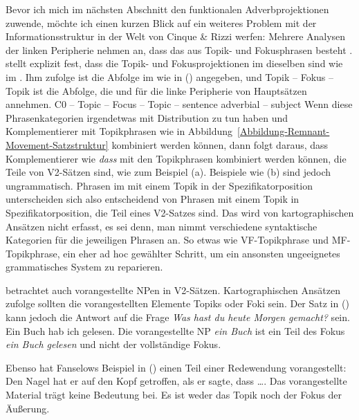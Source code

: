 Bevor ich mich im nächsten Abschnitt den funktionalen Adverbprojektionen zuwende, möchte ich einen kurzen Blick auf
ein weiteres Problem mit der Informationsstruktur in der Welt von Cinque \& Rizzi \citep[]{Rizzi97a-u} werfen: Mehrere Analysen der linken
Peripherie nehmen an, dass das \vf{} aus Topik- und Fokusphrasen besteht \parencites[,
240]{Grewendorf2002a}[, 93]{Grewendorf2005a-u}{Grewendorf2009a}. \citet[]{Grewendorf2005a-u} stellt explizit fest, dass die Topik- und Fokusprojektionen im \mf{} dieselben sind
wie im \vf. Ihm zufolge ist die Abfolge im \mf{} wie in () angegeben, und Topik -- Fokus --
Topik ist die Abfolge, die \citet[]{Rizzi97a-u} und \citet[]{Grewendorf2002a} für die linke Peripherie von
Hauptsätzen annehmen.
\ea
C0 – Topic – Focus – Topic – sentence adverbial – subject
\z
Wenn diese Phrasenkategorien irgendetwas mit Distribution zu tun haben und Komplementierer mit
Topikphrasen wie in Abbildung~\ref{Abbildung-Remnant-Movement-Satzstruktur} kombiniert werden können, dann folgt daraus, dass
Komplementierer wie \emph{dass} mit den Topikphrasen kombiniert werden können, die Teile von V2-Sätzen sind, wie zum
Beispiel (a). Beispiele wie (b) sind jedoch ungrammatisch.
\eal
{}
\zl
Phrasen im \mf{} mit einem Topik in der Spezifikatorposition unterscheiden sich also entscheidend von Phrasen mit einem
Topik in Spezifikatorposition, die Teil eines V2-Satzes sind. Das wird von kartographischen Ansätzen nicht erfasst, es sei denn, man nimmt
verschiedene syntaktische Kategorien für die jeweiligen Phrasen an. So etwas wie VF-Topikphrase und MF-%
Topikphrase, ein eher ad hoc gewählter Schritt, um ein ansonsten ungeeignetes grammatisches System zu reparieren.

\citet{Fanselow2006a} betrachtet auch vorangestellte NPen in V2-Sätzen. Kartographischen Ansätzen
zufolge sollten die vorangestellten Elemente Topiks oder Foki sein. Der Satz in () kann jedoch
die Antwort auf die Frage \emph{Was hast du heute Morgen gemacht?} sein.
\ea
Ein Buch hab ich gelesen.
\z
Die vorangestellte NP \emph{ein Buch} ist ein Teil des Fokus \emph{ein Buch gelesen}
und nicht der vollständige Fokus.

Ebenso hat Fanselows Beispiel in () einen Teil einer Redewendung
vorangestellt:
\ea
Den Nagel hat er auf den Kopf getroffen, als er sagte, dass \ldots.
\z
Das vorangestellte Material trägt keine Bedeutung bei. Es ist weder das Topik noch der Fokus der
Äußerung.


